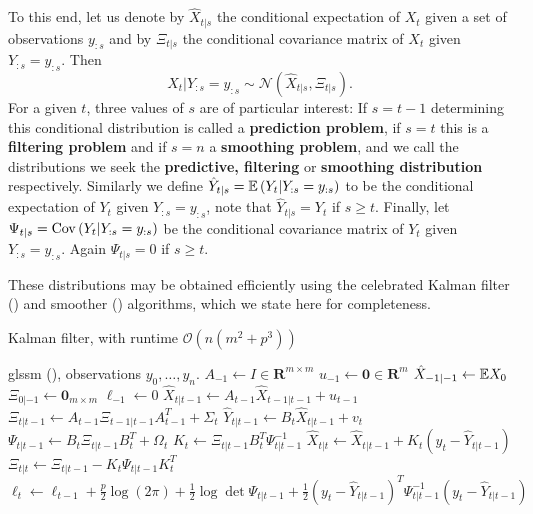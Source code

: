 To this end, let us denote by $\hat X_{t | s}$ the conditional expectation of $X_{t}$ given a set of observations $y_{:s}$ and by $\Xi_{t | s}$ the conditional covariance matrix of $X_{t}$ given $Y_{:s} = y_{:s}$. Then $$X_{t} | Y_{:s} = y_{:s} \sim \mathcal N \left( \hat X_{t|s}, \Xi_{t|s} \right).$$ For a given $t$, three values of $s$ are of particular interest: If $s = t - 1$ determining this conditional distribution is called a \textbf{prediction problem}, if $s = t$ this is a \textbf{filtering problem} and if $s = n$ a \textbf{smoothing problem}, and we call the distributions we seek the \textbf{predictive, filtering} or \textbf{smoothing distribution} respectively. 
Similarly we define $\hat Y_{t|s} = \mathbb E \left( Y_{t} \middle| Y_{:s} = y_{:s} \right)$ to be the conditional expectation of $Y_{t}$ given $Y_{:s}=y_{:s}$, note that $\hat Y_{t|s} = Y_{t}$ if $s \geq t$. Finally, let $\Psi_{t|s} = \operatorname{Cov} \left( Y_{t} | Y_{:s} = y_{:s} \right)$ be the conditional covariance matrix of $Y_{t}$ given $Y_{:s} = y_{:s}$. Again $\Psi_{t|s} = 0$ if $s \geq t$. 

These distributions may be obtained efficiently using the celebrated Kalman filter () and smoother () algorithms, which we state here for completeness.

\begin{algorithm}
    \caption{Kalman filter, with runtime $\mathcal O(n(m^{2} + p^{3}))$}
    \label{alg:kalman_filter}
    \begin{algorithmic}[1]
        \Require \gls{glssm} (), observations $y_{0}, \dots, y_{n}$.
        \State $A_{-1} \gets I \in \mathbf R^{m\times m}$ 
        \State $u_{-1} \gets \mathbf 0 \in \mathbf R^{m}$ 
        \State $\hat X_{-1|-1} \gets \mathbb E X_0$
        \State $\Xi_{0|-1} \gets \mathbf 0_{m\times m}$
        \State $\ell_{-1} \gets 0$
            \State\label{step:kf_loop} $\hat X_{t| t - 1} \gets A_{t-1} \hat X_{t-1|t-1} + u_{t-1}$ 
            \State $\Xi_{t | t - 1} \gets A_{t - 1} \Xi_{t - 1 | t - 1 } A_{t - 1}^{T} + \Sigma_{t}$ 
            \State $\hat Y_{t|t - 1} \gets B_{t}\hat X_{t | t - 1} + v_{t}$
            \State $\Psi_{t|t - 1} \gets B_{t}\Xi_{t | t - 1} B_{t}^T + \Omega_{t}$
            \State $K_t \gets \Xi_{t | t - 1} B_{t}^T \Psi_{t | t - 1} ^{-1}$ 
            \State $\hat X_{t | t} \gets \hat X_{t | t - 1} + K_t (y_{t} - \hat Y_{t | t - 1})$
            \State $\Xi_{t| t } \gets \Xi_{t | t - 1} - K_t \Psi_{t| t - 1} K_t^T$
            \State $\ell_{t} \gets \ell_{t - 1} + \frac{p}{2} \log (2\pi) + \frac{1}{2}\log\det \Psi_{t|t -1} + \frac{1}{2} \left( y_{t} - \hat Y_{t | t - 1} \right)^{T} \Psi_{t|t-1}^{-1} \left( y_{t} - \hat Y_{t | t - 1} \right) $ 
        \EndFor
    \end{algorithmic}
\end{algorithm}

